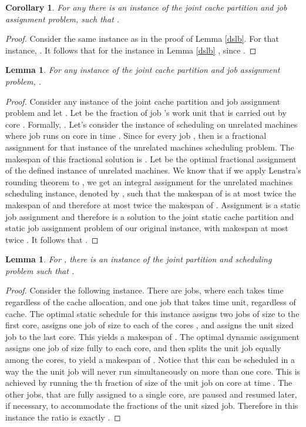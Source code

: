 \documentclass[11pt]{article}
\newtheorem{corollary}[theorem]{Corollary}
\newtheorem{lemma}[theorem]{Lemma}
\begin{document}
\begin{corollary}
For any  there is an instance of the joint cache partition and job assignment problem, such that .
\end{corollary}
\begin{proof}
Consider the same instance as in the proof of Lemma \ref{dslb}.
For that instance, .
It follows that   for the instance in  Lemma \ref{dslb} , since .
\end{proof}

\begin{lemma}\label{sdub}
For any instance of the joint cache partition and job assignment problem, .
\end{lemma}
\begin{proof}
Consider any instance of the joint cache partition and job assignment problem and let .
Let  be the fraction of job 's work unit that is carried out by core . Formally, .
Let's consider the instance of scheduling on unrelated machines where job  runs on core  in time .
Since for every job ,  then  is a fractional assignment for that instance of the unrelated machines scheduling problem.
The makespan of this fractional solution is .
Let  be the optimal fractional assignment of the defined instance of unrelated machines. We know that if we apply Lenstra's rounding theorem \cite{LST90} to , we get an integral assignment for the unrelated machines scheduling instance, denoted by , such that the makespan of  is at most twice the makespan of  and therefore at most twice the makespan of .
Assignment  is a static job assignment and therefore  is a solution to the joint static cache partition and static job assignment problem of our original instance, with makespan at most twice . It follows that .
\end{proof}

\begin{lemma}\label{sdlb}
For , there is an instance of the joint partition and scheduling problem such that .
\end{lemma}
\begin{proof}
Consider the following instance. There are  jobs, where each takes   time regardless of the cache allocation, and one job that takes  time unit, regardless of cache.
The optimal static schedule for this instance assigns two jobs of size  to the first core, assigns one job of size  to each of the cores , and assigns the unit sized job to the last core. This yields a makespan of .
The optimal dynamic assignment assigns one job of size  fully to each core, and then splits the unit job equally among the cores, to yield a makespan of . Notice that this can be scheduled in a way the the unit job will never run simultaneously on more than one core. This is achieved by running the th fraction of size  of the unit job on core  at time . The other jobs, that are fully assigned to a single core, are paused and resumed later, if necessary, to accommodate the fractions of the unit sized job.
Therefore in this instance the ratio     is exactly .
\end{proof}


\end{document}

